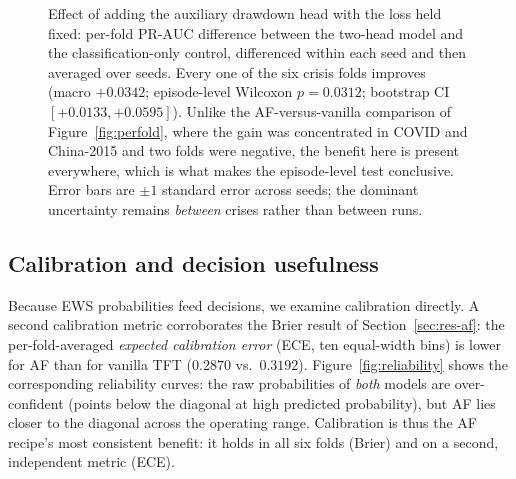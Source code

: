 \documentclass[11pt,a4paper]{article}
\newcommand{\prauc}{\mbox{PR-AUC}}
\begin{document}
\begin{figure}[t]
\centering
{}
\caption{Effect of adding the auxiliary drawdown head with the loss held
fixed: per-fold $\prauc$ difference between the two-head model and the
classification-only control, differenced within each seed and then averaged
over seeds. Every one of the six crisis folds improves (macro $+0.0342$;
episode-level Wilcoxon $p=0.0312$; bootstrap CI $[+0.0133,+0.0595]$). Unlike
the AF-versus-vanilla comparison of Figure~\ref{fig:perfold}, where the gain
was concentrated in COVID and China-2015 and two folds were negative, the
benefit here is present everywhere, which is what makes the episode-level test
conclusive. Error bars are $\pm1$ standard error across seeds; the dominant
uncertainty remains \emph{between} crises rather than between runs.}
\label{fig:heads}
\end{figure}

\subsection{Calibration and decision usefulness}
\label{sec:res-calib}
Because EWS probabilities feed decisions, we examine calibration directly. A
second calibration metric corroborates the Brier result of
Section~\ref{sec:res-af}: the per-fold-averaged \emph{expected calibration
error} (ECE, ten equal-width bins) is lower for AF than for vanilla TFT
($0.2870$ vs.\ $0.3192$). Figure~\ref{fig:reliability} shows the corresponding
reliability curves: the raw probabilities of \emph{both} models are
over-confident (points below the diagonal at high predicted probability), but
AF lies closer to the diagonal across the operating range. Calibration is thus
the AF recipe's most consistent benefit: it holds in all six folds (Brier) and
on a second, independent metric (ECE).
\end{document}
